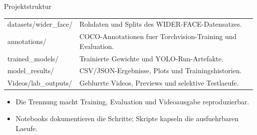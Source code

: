 \begin{frame}[fragile]{Projektstruktur}
\small
\begin{tabularx}{\textwidth}{>{\ttfamily}l X}
\toprule
datasets/wider\_face/ & Rohdaten und Splits des WIDER-FACE-Datensatzes. \\
annotations/ & COCO-Annotationen fuer Torchvision-Training und Evaluation. \\
trained\_models/ & Trainierte Gewichte und YOLO-Run-Artefakte. \\
model\_results/ & CSV/JSON-Ergebnisse, Plots und Trainingshistorien. \\
Videos/lab\_outputs/ & Geblurrte Videos, Previews und selektive Testlaeufe. \\
\bottomrule
\end{tabularx}
\vspace{0.8em}
\begin{itemize}
    \item Die Trennung macht Training, Evaluation und Videoausgabe reproduzierbar.
    \item Notebooks dokumentieren die Schritte; Skripte kapseln die ausfuehrbaren Laeufe.
\end{itemize}
\end{frame}
